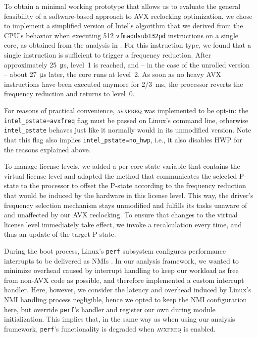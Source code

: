 To obtain a minimal working prototype that allows us to evaluate the general feasibility of a software-based approach to \gls{AVX} reclocking optimization, we chose to implement a simplified version of Intel's algorithm that we derived from the \gls{CPU}'s behavior when executing \SI[number-unit-product=-]{512}{\bit} \texttt{vfmaddsub132pd} instructions on a single core, as obtained from the analysis in . For this instruction type, we found that a single instruction is sufficient to trigger a frequency reduction. After  approximately \SI{25}{\micro\second}, level~1 is reached, and -- in the case of the unrolled version -- about \SI{27}{\micro\second} later, the core runs at level~2. As soon as no heavy \gls{AVX} instructions have been executed anymore for \SI[quotient-mode=fraction]{2/3}{\milli\second}, the processor reverts the frequency reduction and returns to level~0. %

For reasons of practical convenience, \textsc{avxfreq} was implemented to be opt-in: the \texttt{intel\_pstate=avxfreq} flag must be passed on \gls{Linux}'s command line, otherwise \texttt{intel\_pstate} behaves just like it normally would in its unmodified version. Note that this flag also implies \texttt{intel\_pstate=no\_hwp}, i.e., it also disables \gls{HWP} for the reasons explained above.

To manage license levels, we added a per-core state variable that contains the virtual license level and adapted the method that communicates the selected \gls{P-state} to the processor to offset the \gls{P-state} according to the frequency reduction that would be induced by the hardware in this license level. This way, the driver's frequency selection mechanism stays unmodified and fulfills its tasks unaware of and unaffected by our \gls{AVX} reclocking. To ensure that changes to the virtual license level immediately take effect, we invoke a recalculation every time, and thus an update of the target \gls{P-state}.

During the boot process, \gls{Linux}'s \texttt{perf} subsystem configures performance interrupts to be delivered as \glspl{NMI} \cite{kernelx86eventscore}. In our analysis framework, we wanted to minimize overhead caused by interrupt handling to keep our workload as free from non-\gls{AVX} code as possible, and therefore implemented a custom interrupt handler. Here, however, we consider the latency and overhead induced by Linux's \gls{NMI} handling process negligible, hence we opted to keep the \gls{NMI} configuration here, but override \texttt{perf}'s handler and register our own during module initialization. This implies that, in the same way as when using our analysis framework, \texttt{perf}'s functionality is degraded when \textsc{avxfreq} is enabled.

